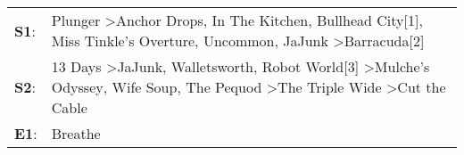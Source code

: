 \begin{supertabular}{p{0.03\textwidth}p{0.92\textwidth}}
 \textbf{S1}:  &                                                            Plunger\textsuperscript{} \textgreater \enspace Anchor Drops\textsuperscript{}, \enspace In The Kitchen\textsuperscript{}, \enspace Bullhead City[1]\textsuperscript{}, \enspace Miss Tinkle's Overture\textsuperscript{}, \enspace Uncommon\textsuperscript{}, \enspace JaJunk\textsuperscript{} \textgreater \enspace Barracuda[2]\textsuperscript{}  \enspace  \\
 \textbf{S2}:  &  13 Days\textsuperscript{} \textgreater \enspace JaJunk\textsuperscript{}, \enspace Walletsworth\textsuperscript{}, \enspace Robot World[3]\textsuperscript{} \textgreater \enspace Mulche's Odyssey\textsuperscript{}, \enspace Wife Soup\textsuperscript{}, \enspace The Pequod\textsuperscript{} \textgreater \enspace The Triple Wide\textsuperscript{} \textgreater \enspace Cut the Cable\textsuperscript{}  \enspace  \\
 \textbf{E1}:  &                                                                                                                                                                                                                                                                                                                                                                                         Breathe\textsuperscript{}  \enspace  \\
\end{supertabular}
